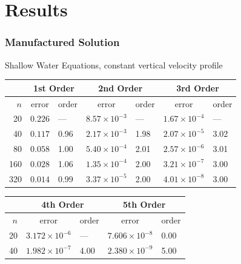 \documentclass[10pt]{beamer}
\begin{document}
  \section{Results}
    \begin{frame}
        \frametitle{Manufactured Solution}
        Shallow Water Equations, constant vertical velocity profile
        \footnotesize
        \begin{table}
          \centering
          \begin{tabular}{r*{6}l}
            \toprule
            & \multicolumn{2}{c}{1st Order} & \multicolumn{2}{c}{2nd Order} & \multicolumn{2}{c}{3rd Order} \\
            \midrule
            \(n\) & \multicolumn{1}{c}{error} & order & \multicolumn{1}{c}{error} & order & \multicolumn{1}{c}{error} & order\\
            \midrule
             20 & \( 0.226 \) & ---  & \( 8.57 \times 10^{-3} \) &  --- & \( 1.67 \times 10^{-4} \) &  --- \\
             40 & \( 0.117 \) & 0.96 & \( 2.17 \times 10^{-3} \) & 1.98 & \( 2.07 \times 10^{-5} \) & 3.02 \\
             80 & \( 0.058 \) & 1.00 & \( 5.40 \times 10^{-4} \) & 2.01 & \( 2.57 \times 10^{-6} \) & 3.01 \\
            160 & \( 0.028 \) & 1.06 & \( 1.35 \times 10^{-4} \) & 2.00 & \( 3.21 \times 10^{-7} \) & 3.00 \\
            320 & \( 0.014 \) & 0.99 & \( 3.37 \times 10^{-5} \) & 2.00 & \( 4.01 \times 10^{-8} \) & 3.00 \\
            \bottomrule
          \end{tabular}
        \end{table}
        \begin{table}
          \centering
          \begin{tabular}{r*{4}l}
            \toprule
            & \multicolumn{2}{c}{4th Order} & \multicolumn{2}{c}{5th Order} \\
            \midrule
            \(n\) & \multicolumn{1}{c}{error} & order & \multicolumn{1}{c}{error} & order \\
            \midrule
             20 & \( 3.172 \times 10^{-6}  \) & ---  & \( 7.606 \times 10^{-8}  \) & 0.00 \\
             40 & \( 1.982 \times 10^{-7}  \) & 4.00 & \( 2.380 \times 10^{-9}  \) & 5.00 \\

\end{tabular}
\end{table}
\end{frame}
\end{document}
